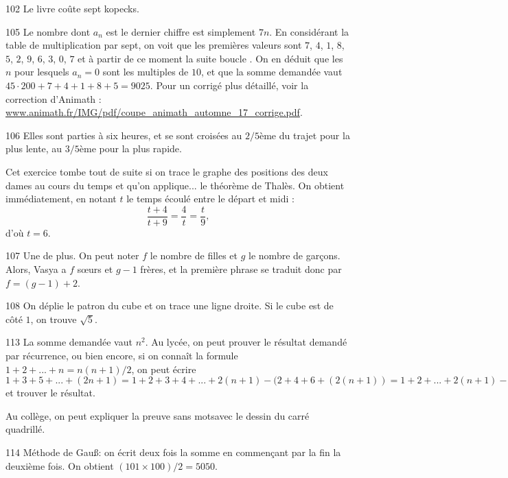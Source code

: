 \begin{Soln}{102}
Le livre coûte sept kopecks.
\end{Soln}
\begin{Soln}{105}
Le nombre dont $a_n$ est le dernier chiffre est simplement $7n$. En considérant la table de multiplication par sept, on voit que les premières valeurs sont $7$, $4$, $1$, $8$, $5$, $2$, $9$, $6$, $3$, $0$, $7$ et à partir de ce moment la suite \og boucle \fg. On en déduit que les $n$ pour lesquels $a_n=0$ sont les multiples de $10$, et que la somme demandée vaut $45\cdot 200+7+4+1+8+5 = 9025$. Pour un corrigé plus détaillé, voir la correction d'Animath : \url{www.animath.fr/IMG/pdf/coupe_animath_automne_17_corrige.pdf}.
\end{Soln}
\begin{Soln}{106}
Elles sont parties à six heures, et se sont croisées au $2/5$ème du trajet pour la plus lente, au $3/5$ème pour la plus rapide.

Cet exercice tombe tout de suite si on trace le graphe des positions des deux dames au cours du temps et qu'on applique... le théorème de Thalès. On obtient immédiatement, en notant $t$ le temps écoulé entre le départ et midi :
\[ \frac{t+4}{t+9} = \frac{4}{t} = \frac{t}{9},\]
d'où $t=6$.
\end{Soln}
\begin{Soln}{107}
 Une de plus. On peut noter $f$ le nombre de filles et $g$ le nombre de garçons. Alors, Vasya a $f$ sœurs et $g-1$ frères, et la première phrase se traduit donc par $f = (g-1)+2$.
\end{Soln}
\begin{Soln}{108}
On déplie le patron du cube et on trace une ligne droite. Si le cube est de côté $1$, on trouve $\sqrt 5$.
\end{Soln}
\begin{Soln}{113}
La somme demandée vaut $n^2$.
Au lycée, on peut prouver le résultat demandé par récurrence, ou bien encore, si on connaît la formule $1+2+...+n = n(n+1)/2$, on peut écrire $1+3+5+...+(2n+1) = 1+2+3+4+...+2(n+1) -(2+4+6+(2(n+1)) = 1+2+...+2(n+1) -2(1+2+...+(n+1))$ et trouver le résultat.

Au collège, on peut expliquer la \og preuve sans mots\fg avec le dessin du carré quadrillé.
\end{Soln}
\begin{Soln}{114}
Méthode de Gau\ss : on écrit deux fois la somme en commençant par la fin la deuxième fois. On obtient $(101\times 100)/2 = 5050$.
\end{Soln}
